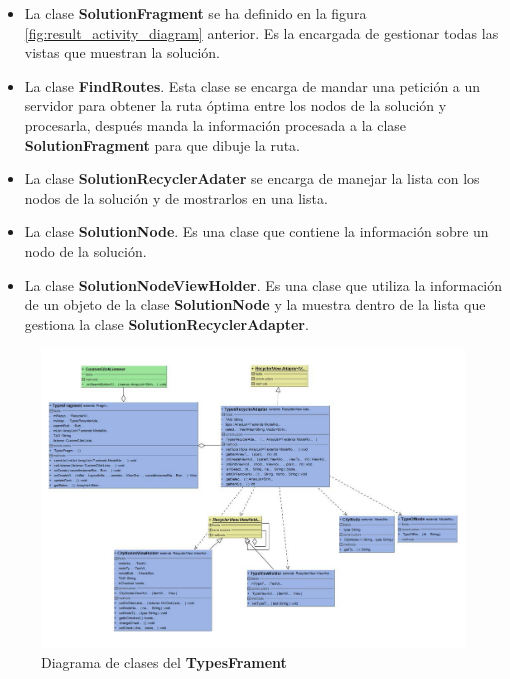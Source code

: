 \begin{itemize}
	\item La clase \textbf{SolutionFragment} se ha definido en la figura \ref{fig:result_activity_diagram} anterior. Es la encargada de gestionar todas las vistas que muestran la solución.
	\item La clase \textbf{FindRoutes}. Esta clase se encarga de mandar una petición a un servidor para obtener la ruta óptima entre los nodos de la solución y procesarla, después manda la información procesada a la clase \textbf{SolutionFragment} para que dibuje la ruta.
	\item La clase \textbf{SolutionRecyclerAdater} se encarga de manejar la lista con los nodos de la solución y de mostrarlos en una lista.
	\item La clase \textbf{SolutionNode}. Es una clase que contiene la información sobre un nodo de la solución.
	\item La clase \textbf{SolutionNodeViewHolder}. Es una clase que utiliza la información de un objeto de la clase \textbf{SolutionNode}  y la muestra dentro de la lista que gestiona la clase \textbf{SolutionRecyclerAdapter}.
\end{itemize}
\begin{figure}[H]
	\centering
	\label{fig:fragment_diagram}
	\includegraphics[scale=.8,angle=90]{imagenes/fragment_class_diagram.pdf}
	\caption{Diagrama de clases del \textbf{TypesFrament} }
\end{figure}
